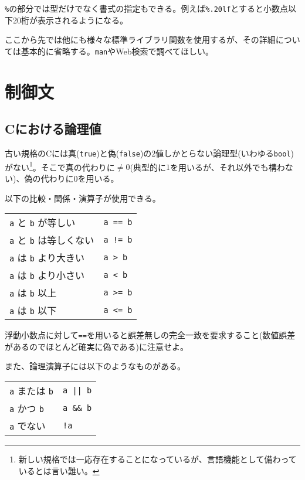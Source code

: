 \texttt{\%}の部分では型だけでなく書式の指定もできる。例えば\texttt{\%.20lf}とすると小数点以下20桁が表示されるようになる。

ここから先では他にも様々な標準ライブラリ関数を使用するが、その詳細については基本的に省略する。\texttt{man}やWeb検索で調べてほしい。

\section{制御文}
\subsection{Cにおける論理値}
古い規格のCには真(\texttt{true})と偽(\texttt{false})の2値しかとらない論理型(いわゆる\texttt{bool})がない\footnote{新しい規格では一応存在することになっているが、言語機能として備わっているとは言い難い。}。そこで真の代わりに\(\neq 0\)(典型的に\(1\)を用いるが、それ以外でも構わない)、偽の代わりに\(0\)を用いる。

以下の比較・関係・演算子が使用できる。
\begin{table}[H]
    \centering
    \begin{tabular}{ll}
        \texttt{a} と \texttt{b} が等しい     & \texttt{a == b} \\
        \texttt{a} と \texttt{b} は等しくない & \texttt{a != b} \\
        \texttt{a} は \texttt{b} より大きい   & \texttt{a > b}  \\
        \texttt{a} は \texttt{b} より小さい   & \texttt{a < b}  \\
        \texttt{a} は \texttt{b} 以上         & \texttt{a >= b} \\
        \texttt{a} は \texttt{b} 以下         & \texttt{a <= b}
    \end{tabular}
\end{table} \noindent
浮動小数点に対して\texttt{==}を用いると誤差無しの完全一致を要求すること(数値誤差があるのでほとんど確実に偽である)に注意せよ。

また、論理演算子には以下のようなものがある。
\begin{table}[H]
    \centering
    \begin{tabular}{ll}
        \texttt{a} または \texttt{b} & \texttt{a || b}   \\
        \texttt{a} かつ \texttt{b}   & \texttt{a \&\& b} \\
        \texttt{a} でない            & \texttt{!a}       \\
    \end{tabular}
\end{table}

